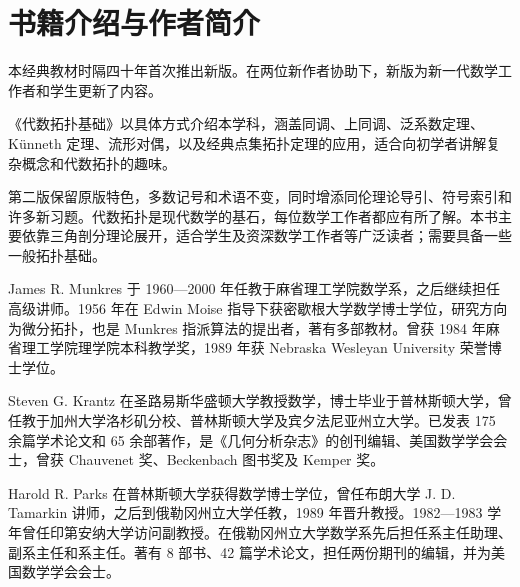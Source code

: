 \chapter*{书籍介绍与作者简介}
本经典教材时隔四十年首次推出新版。在两位新作者协助下，新版为新一代数学工作者和学生更新了内容。

《代数拓扑基础》以具体方式介绍本学科，涵盖同调、上同调、泛系数定理、Künneth 定理、流形对偶，以及经典点集拓扑定理的应用，适合向初学者讲解复杂概念和代数拓扑的趣味。

第二版保留原版特色，多数记号和术语不变，同时增添同伦理论导引、符号索引和许多新习题。代数拓扑是现代数学的基石，每位数学工作者都应有所了解。本书主要依靠三角剖分理论展开，适合学生及资深数学工作者等广泛读者；需要具备一些一般拓扑基础。

James R. Munkres 于 1960—2000 年任教于麻省理工学院数学系，之后继续担任高级讲师。1956 年在 Edwin Moise 指导下获密歇根大学数学博士学位，研究方向为微分拓扑，也是 Munkres 指派算法的提出者，著有多部教材。曾获 1984 年麻省理工学院理学院本科教学奖，1989 年获 Nebraska Wesleyan University 荣誉博士学位。

Steven G. Krantz 在圣路易斯华盛顿大学教授数学，博士毕业于普林斯顿大学，曾任教于加州大学洛杉矶分校、普林斯顿大学及宾夕法尼亚州立大学。已发表 175 余篇学术论文和 65 余部著作，是《几何分析杂志》的创刊编辑、美国数学学会会士，曾获 Chauvenet 奖、Beckenbach 图书奖及 Kemper 奖。

Harold R. Parks 在普林斯顿大学获得数学博士学位，曾任布朗大学 J. D. Tamarkin 讲师，之后到俄勒冈州立大学任教，1989 年晋升教授。1982—1983 学年曾任印第安纳大学访问副教授。在俄勒冈州立大学数学系先后担任系主任助理、副系主任和系主任。著有 8 部书、42 篇学术论文，担任两份期刊的编辑，并为美国数学学会会士。


